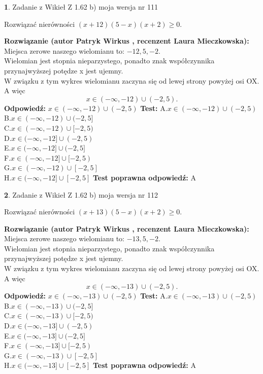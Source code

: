 \documentclass[12pt, a4paper]{article}
\theoremstyle{definition} %
\newtheorem{zad}{}
\newcommand{\zadStart}[1]{\begin{zad}#1\newline}
\newcommand{\zadStop}{\end{zad}}
\newcommand{\rozwStart}[2]{\noindent \textbf{Rozwiązanie (autor #1 , recenzent #2): }\newline}
\newcommand{\rozwStop}{\newline}
\newcommand{\odpStart}{\noindent \textbf{Odpowiedź:}\newline}
\newcommand{\odpStop}{\newline}
\newcommand{\testStart}{\noindent \textbf{Test:}\newline}
\newcommand{\testStop}{\newline}
\newcommand{\kluczStart}{\noindent \textbf{Test poprawna odpowiedź:}\newline}
\newcommand{\kluczStop}{\newline}
\begin{document}
\zadStart{Zadanie z Wikieł Z 1.62 b) moja wersja nr 111}

Rozwiązać nierówności $(x+12)(5-x)(x+2)\ge0$.
\zadStop
\rozwStart{Patryk Wirkus}{Laura Mieczkowska}
Miejsca zerowe naszego wielomianu to: $-12, 5, -2$.\\
Wielomian jest stopnia nieparzystego, ponadto znak współczynnika przy\linebreak najwyższej potędze x jest ujemny.\\ W związku z tym wykres wielomianu zaczyna się od lewej strony powyżej osi OX. A więc $$x \in (-\infty,-12) \cup (-2,5).$$
\rozwStop
\odpStart
$x \in (-\infty,-12) \cup (-2,5)$
\odpStop
\testStart
A.$x \in (-\infty,-12) \cup (-2,5)$\\
B.$x \in (-\infty,-12) \cup (-2,5]$\\
C.$x \in (-\infty,-12) \cup [-2,5)$\\
D.$x \in (-\infty,-12] \cup (-2,5)$\\
E.$x \in (-\infty,-12] \cup (-2,5]$\\
F.$x \in (-\infty,-12] \cup [-2,5)$\\
G.$x \in (-\infty,-12) \cup [-2,5]$\\
H.$x \in (-\infty,-12] \cup [-2,5]$
\testStop
\kluczStart
A
\kluczStop



\zadStart{Zadanie z Wikieł Z 1.62 b) moja wersja nr 112}

Rozwiązać nierówności $(x+13)(5-x)(x+2)\ge0$.
\zadStop
\rozwStart{Patryk Wirkus}{Laura Mieczkowska}
Miejsca zerowe naszego wielomianu to: $-13, 5, -2$.\\
Wielomian jest stopnia nieparzystego, ponadto znak współczynnika przy\linebreak najwyższej potędze x jest ujemny.\\ W związku z tym wykres wielomianu zaczyna się od lewej strony powyżej osi OX. A więc $$x \in (-\infty,-13) \cup (-2,5).$$
\rozwStop
\odpStart
$x \in (-\infty,-13) \cup (-2,5)$
\odpStop
\testStart
A.$x \in (-\infty,-13) \cup (-2,5)$\\
B.$x \in (-\infty,-13) \cup (-2,5]$\\
C.$x \in (-\infty,-13) \cup [-2,5)$\\
D.$x \in (-\infty,-13] \cup (-2,5)$\\
E.$x \in (-\infty,-13] \cup (-2,5]$\\
F.$x \in (-\infty,-13] \cup [-2,5)$\\
G.$x \in (-\infty,-13) \cup [-2,5]$\\
H.$x \in (-\infty,-13] \cup [-2,5]$
\testStop
\kluczStart
A
\kluczStop
\end{document}

